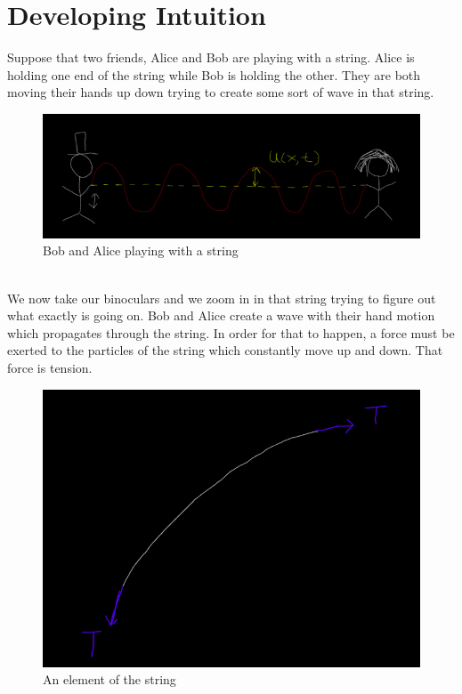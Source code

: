 \documentclass[oneside,hidelinks]{book}
\begin{document}
                \section{Developing Intuition}                
                Suppose that two friends, Alice and Bob are 
                playing with a string. Alice is holding one end of 
                the string while Bob is holding the other. They are
                 both moving their hands up down trying to create 
                 some sort of wave in that string.\\
                 \begin{figure}[hbtp]
                        \caption{Bob and Alice playing with a string}                        
                        \hspace*{2cm}\includegraphics[scale=0.5]{a&b_1.png}
                \end{figure}\\
                We now take our binoculars and we zoom in in that 
                string trying to figure out what exactly is going on.
                Bob and Alice create a wave with their hand motion which propagates 
                through the string. In order for that to happen, a force must be 
                exerted to the particles of the string which constantly move up 
                and down. That force is tension.\\
                \begin{figure}[hbtp]
                        \caption{An element of the string}                        
                        \hspace*{2cm}\includegraphics[scale=0.5]{a&b_2.png}
                \end{figure}\\
\end{document}

